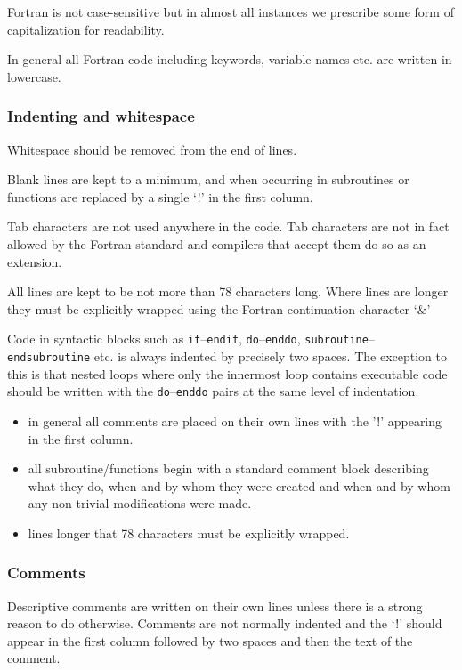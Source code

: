 \documentclass[\mydriver,12pt,twoside,notitlepage,a4paper]{article}
\newcommand{\code}[1]{\texttt{#1}}
\begin{document}
Fortran is not case-sensitive but in almost all instances we prescribe
some form of capitalization for readability.

In general all Fortran code including keywords, variable names etc. are
written in lowercase.

\subsubsection{Indenting and whitespace}
Whitespace should be removed from the end of lines.

Blank lines are kept to a minimum, and when occurring in subroutines
or functions are replaced by a single `!' in the first column.

Tab characters are not used anywhere in the code.  Tab characters are
not in fact allowed by the Fortran standard and compilers that accept
them do so as an extension.

All lines are kept to be not more than 78 characters long. Where
lines are longer they must be explicitly wrapped using the
Fortran continuation character `\&'

Code in syntactic blocks such as \code{if}--\code{endif}, \code{do}--\code{enddo},
\code{subroutine}--\code{endsubroutine} etc. is always indented by precisely two spaces.
The exception to this is that nested loops where only the innermost loop
contains executable code should be written with the \code{do}--\code{enddo}
pairs at the same level of indentation.

\begin{itemize}
\item in general all comments are placed on their own lines with the '!'
appearing in the first column.
\item all subroutine/functions begin with a standard comment block describing
what they do, when and by whom they were created and when and by whom any
non-trivial modifications were made.
\item lines longer that 78 characters must be explicitly wrapped.
\end{itemize}

\subsubsection{Comments}
Descriptive comments are written on their own lines unless there is a
strong reason to do otherwise.  Comments are not normally indented
and the `!' should appear in the first column followed by two spaces
and then the text of the comment.
\end{document}

